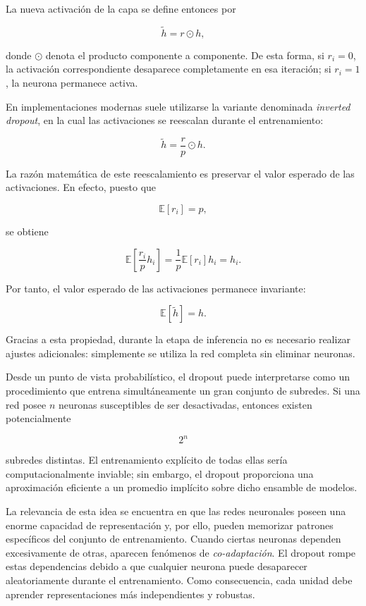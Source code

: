 \documentclass[
  spanish,
  us-letterpaper,
  DIV=11,
  numbers=noendperiod]{scrreprt}
\begin{document}
La nueva activación de la capa se define entonces por

\[
\tilde h=r\odot h,
\]

donde \(\odot\) denota el producto componente a componente. De esta
forma, si \(r_i=0\), la activación correspondiente desaparece
completamente en esa iteración; si \(r_i=1\), la neurona permanece
activa.

En implementaciones modernas suele utilizarse la variante denominada
\emph{inverted dropout}, en la cual las activaciones se reescalan
durante el entrenamiento:

\[
\tilde h=\frac{r}{p}\odot h.
\]

La razón matemática de este reescalamiento es preservar el valor
esperado de las activaciones. En efecto, puesto que

\[
\mathbb{E}[r_i]=p,
\]

se obtiene

\[
\mathbb{E}\left[\frac{r_i}{p}h_i\right]
=
\frac{1}{p}\mathbb{E}[r_i]h_i
=
h_i.
\]

Por tanto, el valor esperado de las activaciones permanece invariante:

\[
\mathbb{E}[\tilde h]=h.
\]

Gracias a esta propiedad, durante la etapa de inferencia no es necesario
realizar ajustes adicionales: simplemente se utiliza la red completa sin
eliminar neuronas.

Desde un punto de vista probabilístico, el dropout puede interpretarse
como un procedimiento que entrena simultáneamente un gran conjunto de
subredes. Si una red posee \(n\) neuronas susceptibles de ser
desactivadas, entonces existen potencialmente

\[
2^n
\]

subredes distintas. El entrenamiento explícito de todas ellas sería
computacionalmente inviable; sin embargo, el dropout proporciona una
aproximación eficiente a un promedio implícito sobre dicho ensamble de
modelos.

La relevancia de esta idea se encuentra en que las redes neuronales
poseen una enorme capacidad de representación y, por ello, pueden
memorizar patrones específicos del conjunto de entrenamiento. Cuando
ciertas neuronas dependen excesivamente de otras, aparecen fenómenos de
\emph{co-adaptación}. El dropout rompe estas dependencias debido a que
cualquier neurona puede desaparecer aleatoriamente durante el
entrenamiento. Como consecuencia, cada unidad debe aprender
representaciones más independientes y robustas.
\end{document}
